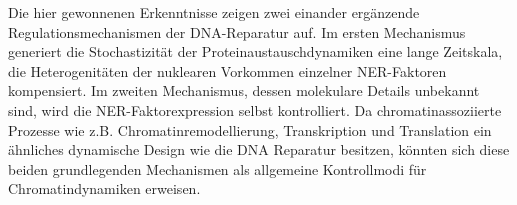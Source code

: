 Die hier gewonnenen Erkenntnisse zeigen zwei einander erg\"{a}nzende Regulationsmechanismen der DNA-Reparatur auf. Im ersten Mechanismus generiert die Stochastizit\"{a}t der Proteinaustauschdynamiken eine lange Zeitskala, die Heterogenit\"{a}ten der nu\-klearen Vorkommen einzelner NER-Faktoren kompensiert. Im zweiten Mechanismus, dessen molekulare Details unbekannt sind, wird die NER-Faktorexpression selbst kontrolliert. Da chromatinassoziierte Prozesse wie z.B. Chromatinremodellierung, Transkription und Translation ein \"{a}hnliches dynamische Design wie die DNA Reparatur besitzen, k\"{o}nn\-ten sich diese beiden grundlegenden Mechanismen als allgemeine Kontrollmodi f\"{u}r Chromatindynamiken erweisen.  


  




